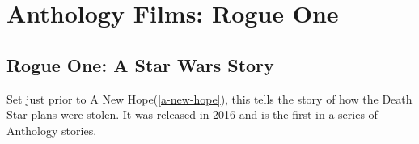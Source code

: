 \chapter{Anthology Films: Rogue One}
		\label{appendixA}


\section{Rogue One: A Star Wars Story}

Set just prior to A New Hope(\ref{a-new-hope}), this tells the story of how
the Death Star plans were stolen. It was released in 2016 and is the first in a series of Anthology stories.



